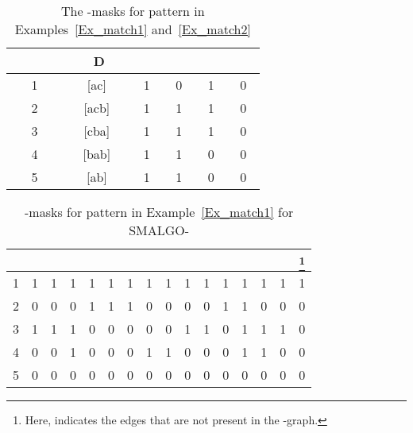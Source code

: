 \documentclass{llncs}
\newcommand{\rom}[1]{\uppercase\expandafter{\romannumeral #1\relax}}
\begin{document}
{\begin{table}
\begin{center}
\begin{tabular}{|c|c|c|c|c|c|}
\hline
~ ~ ~ ~ &~ ~ D~ ~ &~ ~ &~ ~ &~ ~ &~ ~ \\
\hline
1&[ac]&1&0&1&0\\
\hline
2&[acb]&1&1&1&0\\
\hline
3&[cba]&1&1&1&0\\
\hline
4&[bab]&1&1&0&0\\
\hline
5&[ab]&1&1&0&0\\
\hline
\end{tabular}
\caption{The -masks for pattern in Examples~\ref{Ex_match1} and~\ref{Ex_match2} }
\label{common Dmask}
\end{center}
\end{table}

\begin{table}
\begin{center}
\begin{minipage}{\textwidth}
\begin{tabular}{|c|c|c|c|c|c|c|c|c|c|c|c|c|c|c|c|}
\hline
&&&&&&&&&&&&&&&\footnote{Here,  indicates the edges that are not present in the -graph.}\\
\hline
1&1&1&1&1&1&1&1&1&1&1&1&1&1&1&1\\
\hline
2&0&0&0&1&1&1&0&0&0&0&1&1&0&0&0\\
\hline
3&1&1&1&0&0&0&0&0&1&1&0&1&1&1&0\\
\hline
4&0&0&1&0&0&0&1&1&0&0&0&1&1&0&0\\
\hline
5&0&0&0&0&0&0&0&0&0&0&0&0&0&0&0\\
\hline
\end{tabular}
\end{minipage}
\caption{-masks for pattern in Example~\ref{Ex_match1} for SMALGO-\rom{1}}
\label{oldP_mask}
\end{center}
\end{table}


}
\end{document}
